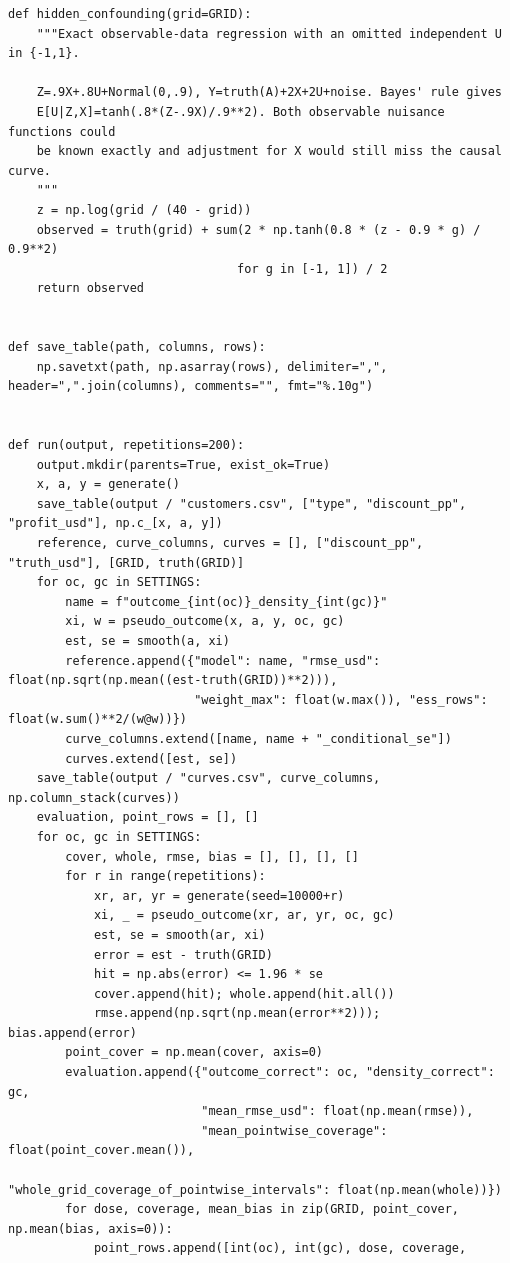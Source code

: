 \begin{Verbatim}[breaklines,breakanywhere,fontsize=\small]
def hidden_confounding(grid=GRID):
    """Exact observable-data regression with an omitted independent U in {-1,1}.

    Z=.9X+.8U+Normal(0,.9), Y=truth(A)+2X+2U+noise. Bayes' rule gives
    E[U|Z,X]=tanh(.8*(Z-.9X)/.9**2). Both observable nuisance functions could
    be known exactly and adjustment for X would still miss the causal curve.
    """
    z = np.log(grid / (40 - grid))
    observed = truth(grid) + sum(2 * np.tanh(0.8 * (z - 0.9 * g) / 0.9**2)
                                for g in [-1, 1]) / 2
    return observed


def save_table(path, columns, rows):
    np.savetxt(path, np.asarray(rows), delimiter=",", header=",".join(columns), comments="", fmt="%.10g")


def run(output, repetitions=200):
    output.mkdir(parents=True, exist_ok=True)
    x, a, y = generate()
    save_table(output / "customers.csv", ["type", "discount_pp", "profit_usd"], np.c_[x, a, y])
    reference, curve_columns, curves = [], ["discount_pp", "truth_usd"], [GRID, truth(GRID)]
    for oc, gc in SETTINGS:
        name = f"outcome_{int(oc)}_density_{int(gc)}"
        xi, w = pseudo_outcome(x, a, y, oc, gc)
        est, se = smooth(a, xi)
        reference.append({"model": name, "rmse_usd": float(np.sqrt(np.mean((est-truth(GRID))**2))),
                          "weight_max": float(w.max()), "ess_rows": float(w.sum()**2/(w@w))})
        curve_columns.extend([name, name + "_conditional_se"])
        curves.extend([est, se])
    save_table(output / "curves.csv", curve_columns, np.column_stack(curves))
    evaluation, point_rows = [], []
    for oc, gc in SETTINGS:
        cover, whole, rmse, bias = [], [], [], []
        for r in range(repetitions):
            xr, ar, yr = generate(seed=10000+r)
            xi, _ = pseudo_outcome(xr, ar, yr, oc, gc)
            est, se = smooth(ar, xi)
            error = est - truth(GRID)
            hit = np.abs(error) <= 1.96 * se
            cover.append(hit); whole.append(hit.all())
            rmse.append(np.sqrt(np.mean(error**2))); bias.append(error)
        point_cover = np.mean(cover, axis=0)
        evaluation.append({"outcome_correct": oc, "density_correct": gc,
                           "mean_rmse_usd": float(np.mean(rmse)),
                           "mean_pointwise_coverage": float(point_cover.mean()),
                           "whole_grid_coverage_of_pointwise_intervals": float(np.mean(whole))})
        for dose, coverage, mean_bias in zip(GRID, point_cover, np.mean(bias, axis=0)):
            point_rows.append([int(oc), int(gc), dose, coverage,

\end{Verbatim}
